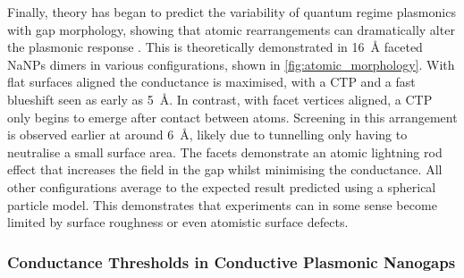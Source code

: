 \documentclass{article}
\begin{document}
Finally, theory has began to predict the variability of quantum regime plasmonics with gap morphology, showing that atomic rearrangements can dramatically alter the plasmonic response \cite{barbry2015}. This is theoretically demonstrated in \SI{16}{\angstrom} faceted NaNPs dimers in various configurations, shown in \autoref{fig:atomic_morphology}. With flat surfaces aligned the conductance is maximised, with a CTP and a fast blueshift seen as early as \SI{5}{\angstrom}. In contrast, with facet vertices aligned, a CTP only begins to emerge after contact between atoms. Screening in this arrangement is observed earlier at around \SI{6}{\angstrom}, likely due to tunnelling only having to neutralise a small surface area. The facets demonstrate an atomic lightning rod effect that increases the field in the gap whilst minimising the conductance. All other configurations average to the expected result predicted using a spherical particle model. This demonstrates that experiments can in some sense become limited by surface roughness or even atomistic surface defects.


\subsubsection{Conductance Thresholds in Conductive Plasmonic Nanogaps}
\end{document}

